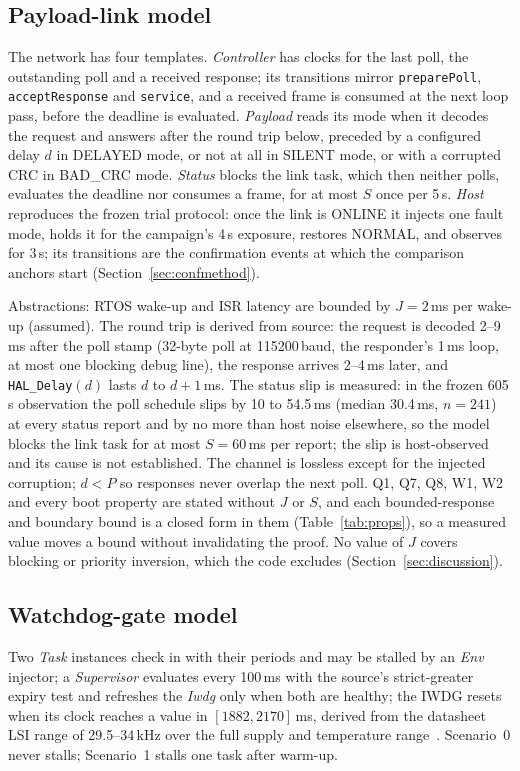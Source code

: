 \documentclass[conference,a4paper]{IEEEtran}
\newif\ifrerunmarks
\DeclareRobustCommand{\rerun}[1]{\ifrerunmarks\textcolor{red}{#1}\else#1\fi}
\begin{document}
\subsection{Payload-link model}
\label{sec:models}
The network has four templates. \emph{Controller} has clocks for the last poll, the outstanding poll and a received response; its transitions mirror \texttt{preparePoll}, \texttt{acceptResponse} and \texttt{service}, and a received frame is consumed at the next loop pass, before the deadline is evaluated. \emph{Payload} reads its mode when it decodes the request and answers after the round trip below, preceded by a configured delay $d$ in DELAYED mode, or not at all in SILENT mode, or with a corrupted CRC in BAD\_CRC mode. \emph{Status} blocks the link task, which then neither polls, evaluates the deadline nor consumes a frame, for at most $S$ once per 5\,s. \emph{Host} reproduces the frozen trial protocol: once the link is ONLINE it injects one fault mode, holds it for the campaign's 4\,s exposure, restores NORMAL, and observes for 3\,s; its transitions are the confirmation events at which the comparison anchors start (Section~\ref{sec:confmethod}).

Abstractions: RTOS wake-up and ISR latency are bounded by \rerun{$J{=}2$\,ms per wake-up (assumed)}. \rerun{The round trip is derived from source: the request is decoded 2--9\,ms after the poll stamp (32-byte poll at 115200\,baud, the responder's 1\,ms loop, at most one blocking debug line), the response arrives 2--4\,ms later}, and \texttt{HAL\_Delay}$(d)$ lasts $d$ to $d{+}1$\,ms. \rerun{The status slip is measured: in the frozen 605\,s observation the poll schedule slips by 10 to 54.5\,ms (median 30.4\,ms, $n{=}241$) at every status report and by no more than host noise elsewhere, so the model blocks the link task for at most $S{=}60$\,ms per report; the slip is host-observed and its cause is not established.} The channel is lossless except for the injected corruption; $d<P$ so responses never overlap the next poll. Q1, Q7, Q8, W1, W2 and every boot property are stated without $J$ or $S$, and each bounded-response and boundary bound is a closed form in them (Table~\ref{tab:props}), so a measured value moves a bound without invalidating the proof. No value of $J$ covers blocking or priority inversion, which the code excludes (Section~\ref{sec:discussion}).



\subsection{Watchdog-gate model}
Two \emph{Task} instances check in with their periods and may be stalled by an \emph{Env} injector; a \emph{Supervisor} evaluates every 100\,ms with the source's strict-greater expiry test and refreshes the \emph{Iwdg} only when both are healthy; the IWDG resets when its clock reaches a value in $[1882,2170]$\,ms, derived from the datasheet LSI range of 29.5--34\,kHz over the full supply and temperature range~\cite{st2021ds12589}. Scenario~0 never stalls; Scenario~1 stalls one task after warm-up.
\end{document}

